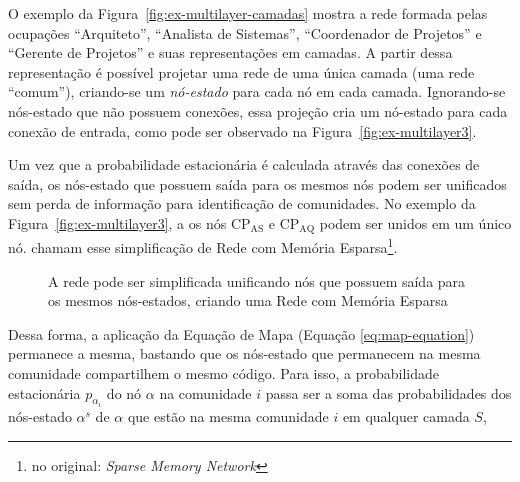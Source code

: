 \documentclass[
  article,
  11pt,
  a4paper,
  english,
  brazil,
  sumario=tradicional]{abntex2}
\begin{document}
O exemplo da Figura~\ref{fig:ex-multilayer-camadas} mostra a rede formada pelas ocupações \enquote{Arquiteto}, \enquote{Analista de Sistemas}, \enquote{Coordenador de Projetos} e \enquote{Gerente de Projetos} e suas representações em camadas. A partir dessa representação é possível projetar uma rede de uma única camada (uma rede \enquote{comum}), criando-se um \textit{nó-estado} para cada nó em cada camada. Ignorando-se nós-estado que não possuem conexões, essa projeção cria um nó-estado para cada conexão de entrada, como pode ser observado na Figura~\ref{fig:ex-multilayer3}.

Um vez que a probabilidade estacionária é calculada através das conexões de saída, os nós-estado que possuem saída para os mesmos nós podem ser unificados sem perda de informação para identificação de comunidades. No exemplo da Figura~\ref{fig:ex-multilayer3}, a os nós $\text{CP}_\text{AS}$ e $\text{CP}_\text{AQ}$ podem ser unidos em um único nó.  chamam esse simplificação de Rede com Memória Esparsa\footnote{no original: \textit{Sparse Memory Network}}.

\begin{figure}[htb]
    \centering
    \caption{A rede pode ser simplificada unificando nós que possuem saída para os mesmos nós-estados, criando uma Rede com Memória Esparsa~\cite{Edler2017-kt}}
    \label{fig:ex-multilayer-memoria}
\end{figure}

Dessa forma, a aplicação da Equação de Mapa (Equação \ref{eq:map-equation}) permanece a mesma, bastando que os nós-estado que permanecem na mesma comunidade compartilhem o mesmo código. Para isso, a probabilidade estacionária $p_{\alpha_i}$ do nó $\alpha$ na comunidade $i$ passa ser a soma das probabilidades dos nós-estado $\alpha^s$ de $\alpha$ que estão na mesma comunidade $i$ em qualquer camada $S$,
\end{document}
